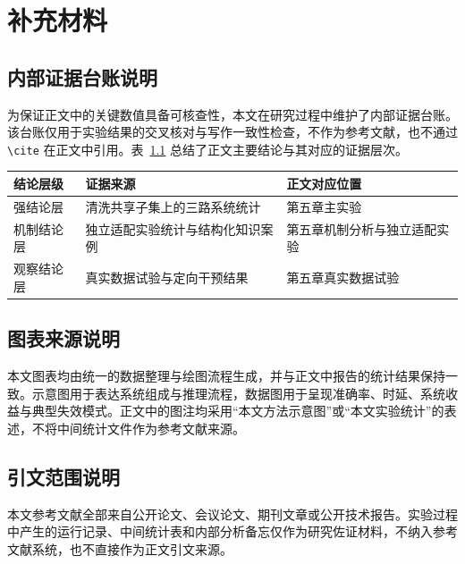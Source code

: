 
\chapter{补充材料}
\label{cha:appendix}

\section{内部证据台账说明}
\label{sec:appendix-ledger}

为保证正文中的关键数值具备可核查性，本文在研究过程中维护了内部证据台账。该台账仅用于实验结果的交叉核对与写作一致性检查，不作为参考文献，也不通过 \verb|\cite| 在正文中引用。表~\ref{tab:evidence-ledger} 总结了正文主要结论与其对应的证据层次。

\begin{table}[htbp]
  \centering
  \small
  \label{tab:evidence-ledger}
  \begin{tabularx}{\textwidth}{l l X}
    \toprule
    结论层级 & 证据来源 & 正文对应位置 \\
    \midrule
    强结论层 & 清洗共享子集上的三路系统统计 & 第五章主实验 \\
    机制结论层 & 独立适配实验统计与结构化知识案例 & 第五章机制分析与独立适配实验 \\
    观察结论层 & 真实数据试验与定向干预结果 & 第五章真实数据试验 \\
    \bottomrule
  \end{tabularx}
\end{table}

\section{图表来源说明}
\label{sec:appendix-figure-source}

本文图表均由统一的数据整理与绘图流程生成，并与正文中报告的统计结果保持一致。示意图用于表达系统组成与推理流程，数据图用于呈现准确率、时延、系统收益与典型失效模式。正文中的图注均采用“本文方法示意图”或“本文实验统计”的表述，不将中间统计文件作为参考文献来源。

\section{引文范围说明}
\label{sec:appendix-citation-scope}

本文参考文献全部来自公开论文、会议论文、期刊文章或公开技术报告。实验过程中产生的运行记录、中间统计表和内部分析备忘仅作为研究佐证材料，不纳入参考文献系统，也不直接作为正文引文来源。
